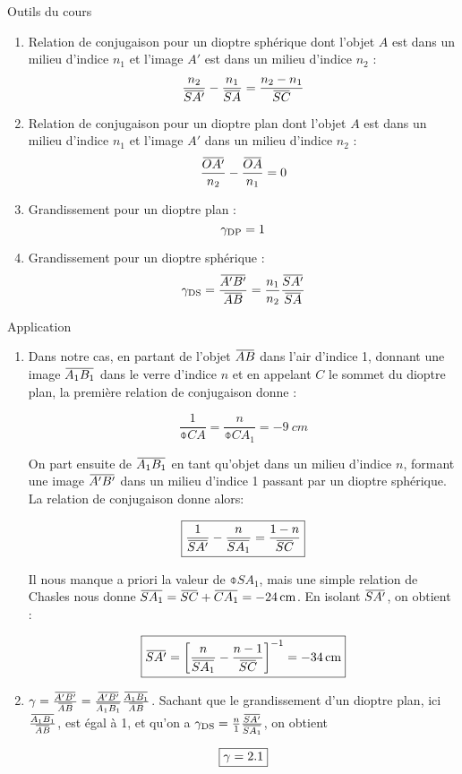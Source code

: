 \documentclass[10pt,a5paper,notitlepage]{book}
\begin{document}
\begin{btcb}{Outils du cours}
    \begin{enumerate}
        \item Relation de conjugaison pour un dioptre sphérique dont l'objet
            $A$ est dans un milieu d'indice $n_1$ et l'image $A'$ est dans un
            milieu d'indice $n_2$ :
            \[ \frac{n_2}{\SAp} - \frac{n_1}{\SA} = \frac{n_2 - n_1}{\SC}\]
        \item Relation de conjugaison pour un dioptre plan dont l'objet $A$ est
            dans un milieu d'indice $n_1$ et l'image $A'$ dans un milieu
            d'indice $n_2$ :
            \[ \frac{\OAp}{n_2} - \frac{\OA}{n_1} = 0 \]
        \item Grandissement pour un dioptre plan :
            \[ \gamma _{\text{DP}} = 1 \]
        \item Grandissement pour un dioptre sphérique :
            \[ \g \St{DS} = \frac{\ABp}{\ABb} = \frac{n_1}{n_2}
            \frac{\SAp}{\SA}\]
    \end{enumerate}
\end{btcb}

\begin{lgtcb}{Application}
    \begin{enumerate}

        \item Dans notre cas, en partant de l'objet $\ABb$ dans l'air d'indice
            1, donnant une image $\ABa$ dans le verre d'indice $n$ et en
            appelant $C$ le sommet du dioptre plan, la première relation de
            conjugaison donne :

            \[ \boxed{ \frac{1}{\obar{CA}} = \frac{n}{\obar{CA_1}} =
            \SI{-9}{cm}} \]
            
            On part ensuite de $\ABa$ en tant qu'objet dans un milieu d'indice
            $n$, formant une image $\ABp$ dans un milieu d'indice 1 passant par
            un dioptre sphérique. La relation de conjugaison donne alors:
            
            \[ \boxed{ \frac{1}{\SAp} - \frac{n}{\obar{SA_1}} = \frac{1 -
            n}{\SC}}\]
            
            Il nous manque a priori la valeur de $\obar{SA_1}$, mais une simple
            relation de Chasles nous donne $\obar{SA_1} = \SC + \obar{CA_1} =
            \SI{-24}{cm}$. En isolant $\SAp$, on obtient :
            
            \[ \boxed{\SAp = \left[ \frac{n}{\obar{SA_1}} - \frac{n -
            1}{\SC}\right]^{-1} = \SI{-34}{cm}}\]

        \item $\g = \frac{\ABp}{\ABb} = \frac{\ABp}{\ABa} \frac{\ABa}{\ABb}$.
            Sachant que le grandissement d'un dioptre plan, ici $
            \frac{\ABa}{\ABb}$, est égal à 1, et qu'on a $\g \St{DS} =
            \frac{n}{1} \frac{\SAp}{\obar{SA_1}}$, on obtient

            \[ \boxed{\gamma = 2.1}\]
    \end{enumerate}
    \end{lgtcb}
\end{document}
